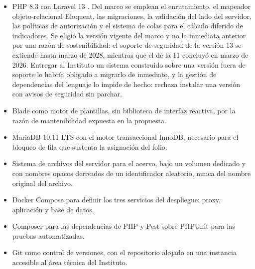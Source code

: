 \begin{description}[leftmargin=0pt,font=\bfseries,itemsep=0.5em,parsep=0pt]
  \item[Lenguaje y marco de trabajo]\leavevmode
  \begin{itemize}[nosep,leftmargin=1.4em,topsep=1pt]
    \item PHP 8.3 con Laravel 13 \cite{laraveldocs}. Del marco se emplean el enrutamiento, el mapeador objeto-relacional Eloquent, las migraciones, la validación del lado del servidor, las políticas de autorización y el sistema de colas para el cálculo diferido de indicadores. Se eligió la versión vigente del marco y no la inmediata anterior por una razón de sostenibilidad: el soporte de seguridad de la versión 13 se extiende hasta marzo de 2028, mientras que el de la 11 concluyó en marzo de 2026. Entregar al Instituto un sistema construido sobre una versión fuera de soporte lo habría obligado a migrarlo de inmediato, y la gestión de dependencias del lenguaje lo impide de hecho: rechaza instalar una versión con avisos de seguridad sin parchar.
    \item Blade como motor de plantillas, sin biblioteca de interfaz reactiva, por la razón de mantenibilidad expuesta en la propuesta.
  \end{itemize}
  \item[Persistencia]\leavevmode
  \begin{itemize}[nosep,leftmargin=1.4em,topsep=1pt]
    \item MariaDB 10.11 LTS con el motor transaccional InnoDB, necesario para el bloqueo de fila que sustenta la asignación del folio.
    \item Sistema de archivos del servidor para el acervo, bajo un volumen dedicado y con nombres opacos derivados de un identificador aleatorio, nunca del nombre original del archivo.
  \end{itemize}
  \item[Entorno y herramientas]\leavevmode
  \begin{itemize}[nosep,leftmargin=1.4em,topsep=1pt]
    \item Docker Compose para definir los tres servicios del despliegue: proxy, aplicación y base de datos.
    \item Composer para las dependencias de PHP y Pest sobre PHPUnit para las pruebas automatizadas.
    \item Git como control de versiones, con el repositorio alojado en una instancia accesible al área técnica del Instituto.
  \end{itemize}
\end{description}

